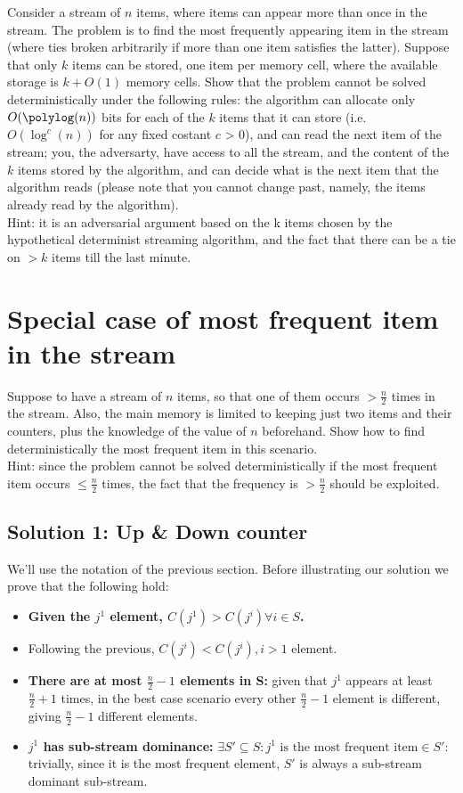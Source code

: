 \documentclass{article}
\begin{document}
Consider a stream of $n$ items, where items can appear more than once in the stream.
The problem is to find the most frequently appearing item in the stream (where ties
broken arbitrarily if more than one item satisfies the latter).
Suppose that only $k$ items can be stored, one item per memory cell, where the
available storage is $k + O(1)$ memory cells.
Show that the problem cannot be solved deterministically under the following rules:
the algorithm can allocate only $O(\polylog(n))$ bits for each of the $k$ items that
it can store (i.e. $O(\log^{c}(n))$ for any fixed costant $c$ > 0), and can read
the next item of the stream; you, the adversarty, have access to all the stream,
and the content of the $k$ items stored by the algorithm, and can decide what is
the next item that the algorithm reads (please note that you cannot change
past, namely, the items already read by the algorithm).
\\Hint: it is an adversarial argument based on the k items chosen by the
hypothetical determinist streaming algorithm, and the fact that there can be a
tie on $> k$ items till the last minute.


\newpage
\section{Special case of most frequent item in the stream}

Suppose to have a stream of $n$ items, so that one of them occurs $> \frac{n}{2}$
times in the stream.
Also, the main memory is limited to keeping just two items and their counters, plus
the knowledge of the value of $n$ beforehand.
Show how to find deterministically the most frequent item in this scenario.
\\ Hint: since the problem cannot be solved deterministically if the most
frequent item occurs $\leq \frac{n}{2}$ times, the fact that the frequency is
$> \frac{n}{2}$ should be exploited.

\subsection{Solution 1: Up \& Down counter}
We'll use the notation of the previous section.
Before illustrating our solution we prove that the following hold:
    \begin{itemize}
    \label{frequence_dominance}\item \textbf{Given the $j^{1}$ element, $C(j^{1}) > C(j^{i}) \forall i \in S$.}
    \item Following the previous, $C(j^{i}) < C(j^{i}),  i > 1$ element.
    \item \textbf{There are at most $\frac{n}{2} - 1$ elements in S:} given that $j^{1}$
    appears at least $\frac{n}{2} + 1$ times, in the best case scenario every
    other $\frac{n}{2} - 1$ element is different, giving $\frac{n}{2} - 1$
    different elements.
    \label{sub-stream_dominance}~\item \textbf{$j^{1}$ has sub-stream dominance:}
    $\exists S' \subseteq S: j^{1} \textrm{ is the most frequent item} \in S'$:
    trivially, since it is the most frequent element, $S'$ is always a sub-stream
    dominant sub-stream.
    \end{itemize}
\end{document}
